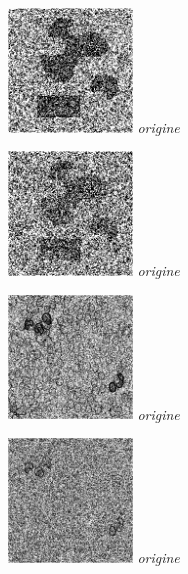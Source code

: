 \documentclass[a4,12pt]{article}
\begin{document}
\begin{minipage}[c]{0.20\linewidth}
	\begin{center}
		\includegraphics[width = 33mm]{./img/p2test_grad_mean_formes2sp2.jpg}
		\textit{origine}
	\end{center}
\end{minipage}
\begin{minipage}[c]{0.20\linewidth}
	\begin{center}
		\includegraphics[width = 33mm]{./img/p2test_grad_mean_formes2sp5.jpg}
		\textit{origine}
	\end{center}
\end{minipage}
\begin{minipage}[c]{0.20\linewidth}
	\begin{center}
		\includegraphics[width = 33mm]{./img/p2test_grad_mean_globulesbb10.jpg}
		\textit{origine}
	\end{center}
\end{minipage}
\begin{minipage}[c]{0.20\linewidth}
	\begin{center}
		\includegraphics[width = 33mm]{./img/p2test_grad_mean_globulesbb25.jpg}
		\textit{origine}
	\end{center}
\end{minipage}
\end{document}
